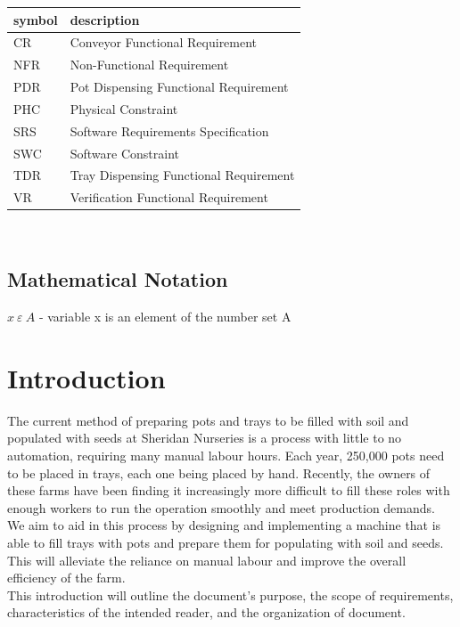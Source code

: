 \documentclass[12pt]{article}
\begin{document}
\renewcommand{\arraystretch}{1.2}
\begin{tabular}{l l} 
  \toprule		
  \textbf{symbol} & \textbf{description}\\
  \midrule 
  CR & Conveyor Functional Requirement\\
  NFR & Non-Functional Requirement\\
  PDR & Pot Dispensing Functional Requirement\\
  PHC & Physical Constraint\\
  SRS & Software Requirements Specification\\
  SWC & Software Constraint\\
  TDR & Tray Dispensing Functional Requirement\\
  VR & Verification Functional Requirement\\
  \bottomrule
\end{tabular}\\

\subsection{Mathematical Notation}
$x\ \varepsilon\ A$ - variable x is an element of the number set A
\newpage



\section{Introduction}

The current method of preparing pots and trays to be filled with soil and populated with seeds at Sheridan Nurseries is a process with little to no automation, requiring many manual labour hours. Each year, 250,000 pots need to be placed in trays, each one being placed by hand. Recently, the owners of these farms have been finding it increasingly more difficult to fill these roles with enough workers to run the operation smoothly and meet production demands.\\

\noindent We aim to aid in this process by designing and implementing a machine that is able to fill trays with pots and prepare them for populating with soil and seeds. This will alleviate the reliance on manual labour and improve the overall efficiency of the farm. \\

\noindent This introduction will outline the document’s purpose, the scope of requirements, characteristics of the intended reader, and the organization of document. 
\end{document}
